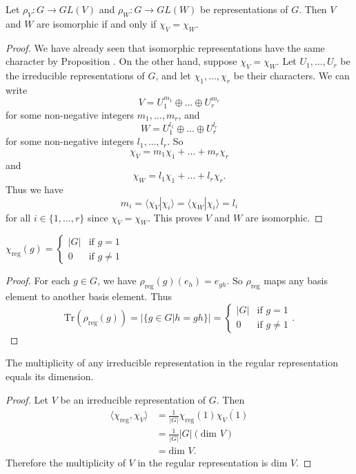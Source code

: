 \begin{cor}
Let $\rho_V \colon G \to GL(V)$ and $\rho_W \colon G \to GL(W)$ be representations of $G$.  Then $V$ and $W$ are isomorphic if and only if $\chi_V = \chi_W$.
\end{cor}
\begin{proof}
We have already seen that isomorphic representations have the same character by Proposition \label{iso-reprns-same-char}.  On the other hand, suppose $\chi_V = \chi_W$.  Let $U_1, \ldots, U_r$ be the irreducible representations of $G$, and let $\chi_1, \ldots, \chi_r$ be their characters.  We can write
\[ V = U_1^{m_1} \oplus \ldots \oplus U_r^{m_r} \]
for some non-negative integers $m_1, \ldots, m_r$, and 
\[ W = U_1^{l_1} \oplus \ldots \oplus U_r^{l_r} \]
for some non-negative integers $l_1, \ldots, l_r$.  So
\[ \chi_V = m_1 \chi_1 + \ldots + m_r \chi_r \]
and 
\[ \chi_W = l_1 \chi_1 + \ldots + l_r \chi_r .\]
Thus we have 
\[ m_i = \langle \chi_V | \chi_i \rangle = \langle \chi_W | \chi_i \rangle = l_i \]
for all $i \in \{1, \ldots, r \}$ since $\chi_V = \chi_W$.  This proves $V$ and $W$ are isomorphic.
\end{proof}

\begin{lemma}
$\chi_{\text{reg}}(g) = \begin{cases} |G| &\text{if } g=1 \\ 0 &\text{if } g \neq 1 \end{cases}$
\end{lemma}
\begin{proof}
For each $g \in G$, we have $\rho_{\text{reg}} (g) (e_h) = e_{gh}$.  So $\rho_{\text{reg}}$ maps any basis element to another basis element.  
Thus \[ \text{Tr} (\rho_{\text{reg}} (g)) = | \{ g \in G | h=gh \} | = \begin{cases} |G| &\text{if } g=1 \\ 0 &\text{if } g \neq 1 \end{cases}. \]
\end{proof}

\begin{prop} \label{mult-of-irr-in-reg}
The multiplicity of any irreducible representation in the regular representation equals its dimension.
\end{prop}
\begin{proof}
Let $V$ be an irreducible representation of $G$.  Then
\begin{align*}
\langle \chi_{\text{reg}}, \chi_V \rangle &= \frac{1}{|G|} \chi_{\text{reg}}(1) \overline{\chi_V (1)} \\
&= \frac{1}{|G|} |G| (\text{dim } V) \\
&= \text{dim } V.
\end{align*}
Therefore the multiplicity of $V$ in the regular representation is $\text{dim } V$.
\end{proof}


